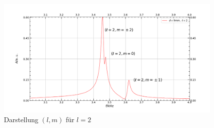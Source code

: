 \documentclass[german,  %
parskip=full,  %
]{scrartcl}
\begin{document}
\begin{figure}[h!]
\centering
\includegraphics[width=\textwidth]{445_fuer_l_gleich_2.png}
\caption{Darstellung $(l,m)$ für $l=2$}
\end{figure}
\\\\
\end{document}
